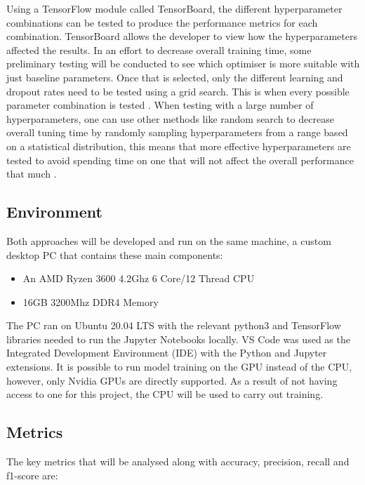 \documentclass[12pt,a4paper]{report}
\begin{document}
Using a TensorFlow module called TensorBoard, the different hyperparameter combinations can be tested to produce the
performance
metrics for each combination. TensorBoard allows the developer to view how the hyperparameters affected the results. 
In an effort to decrease overall training time, some preliminary testing will be conducted to see which 
optimiser is more suitable with just baseline parameters. Once that is selected, only the different 
learning and dropout rates need to be tested using a grid search. This is when every possible parameter combination is tested 
\citep{gridsearch}. 
When testing with a 
large number of hyperparameters, one can use other methods like random search to decrease overall tuning time by 
randomly sampling hyperparameters from a range based on a statistical distribution, this means that more effective 
hyperparameters are tested to avoid spending time on one that will not affect the overall performance that
much \citep{sayak}. 

\subsection{Environment}

\label{subsec:env}

Both approaches will be developed and run on the same machine, a custom desktop PC that contains these main components: 

\begin{itemize}
    \item An AMD Ryzen 3600 4.2Ghz 6 Core/12 Thread CPU
    \item 16GB 3200Mhz DDR4 Memory
\end{itemize}

The PC ran on Ubuntu 20.04 LTS with the relevant python3 and TensorFlow libraries needed to run the Jupyter Notebooks 
locally. VS Code was used as the Integrated Development Environment (IDE) with the Python and Jupyter extensions.  It is
possible to run model training on the GPU instead of the CPU, however, only Nvidia GPUs are directly supported. As a 
result of not having access to one for this project, the CPU will be used to carry out training.

\subsection{Metrics}

The key metrics that will be analysed along with accuracy, precision, recall and f1-score are: 
\end{document}
